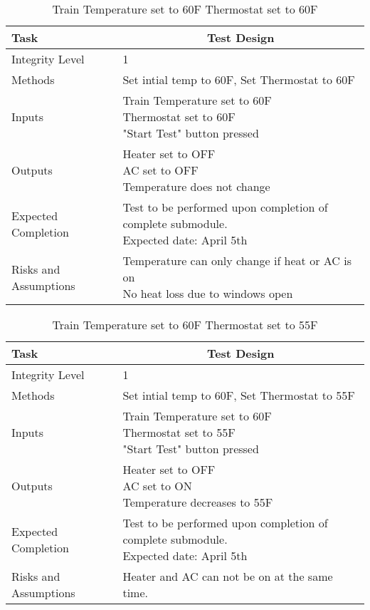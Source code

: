 \documentclass[]{article}
\begin{document}
	\begin{table}[H]
		\centering
		\caption{Train Temperature set to 60F Thermostat set to 60F}
		\begin{tabular}{|l|l|}
			\hline
			Task & \multicolumn{1}{c|}{Test Design} \\ \hline
			Integrity Level & 1 \\ \hline
			Methods & Set intial temp to 60F, Set Thermostat to 60F  \\ \hline
			Inputs &  \parbox[t]{10cm}{Train Temperature set to 60F\\ Thermostat set to 60F\\ "Start Test" button pressed }\\ \hline
			Outputs &\parbox[t]{10cm}{ Heater set to OFF\\AC set to OFF\\ Temperature does not change} \\ \hline
			Expected Completion & \parbox[t]{10cm}{Test to be performed upon completion of complete submodule.\\ Expected date: April 5th}\\ \hline
			Risks and Assumptions & \parbox[t]{10cm}{Temperature can only change if heat or AC is on\\ No heat loss due to windows open}\\ \hline
		\end{tabular}
	\end{table}

	\begin{table}[H]
		\centering
		\caption{Train Temperature set to 60F Thermostat set to 55F}
		\begin{tabular}{|l|l|}
			\hline
			Task & \multicolumn{1}{c|}{Test Design} \\ \hline
			Integrity Level & 1 \\ \hline
			Methods & Set intial temp to 60F, Set Thermostat to 55F  \\ \hline
			Inputs &  \parbox[t]{10cm}{Train Temperature set to 60F\\ Thermostat set to 55F\\ "Start Test" button pressed }\\ \hline
			Outputs &\parbox[t]{10cm}{ Heater set to OFF\\AC set to ON\\ Temperature decreases to 55F} \\ \hline
			Expected Completion & \parbox[t]{10cm}{Test to be performed upon completion of complete submodule.\\ Expected date: April 5th}\\ \hline
			Risks and Assumptions & Heater and AC can not be on at the same time.\\ \hline
		\end{tabular}
	\end{table}
\end{document}

